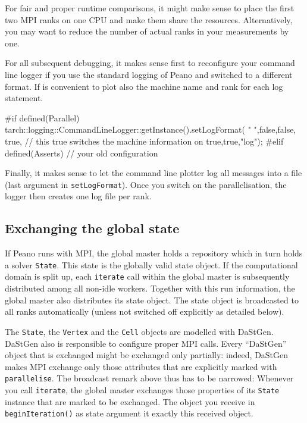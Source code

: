 \begin{remark}
For fair and proper runtime comparisons, it might make sense to place the first
two MPI ranks on one CPU and make them share the resources.
Alternatively, you may want to reduce the number of actual ranks in your
measurements by one.
\end{remark}

For all subsequent debugging, it makes sense first to reconfigure your command
line logger if you use the standard logging of Peano and switched to a different
format. 
If is convenient to plot also the machine name and rank for each log statement.

\begin{code}
#if defined(Parallel)
tarch::logging::CommandLineLogger::getInstance().setLogFormat(
  " ",false,false,
  true, // this true switches the machine information on
  true,true,"log");
#elif defined(Asserts)
// your old configuration
\end{code}

\noindent
Finally, it makes sense to let the command line plotter log all messages into a
file (last argument in \texttt{setLogFormat}).
Once you switch on the parallelisation, the logger then creates one log file per
rank.



\subsection{Exchanging the global state}

If Peano runs with MPI, the global master holds a repository which in turn holds
a solver \texttt{State}. 
This state is the globally valid state object. 
If the computational domain is split up, each \texttt{iterate} call within the
global master is subsequently distributed among all non-idle workers.
Together with this run information, the global master also distributes its state
object.
The state object is broadcasted to all ranks automatically (unless not switched
off explicitly as detailed below).

The \texttt{State}, the \texttt{Vertex} and the \texttt{Cell} objects are
modelled with DaStGen.
DaStGen also is responsible to configure proper MPI calls.
Every ``DaStGen'' object that is exchanged might be exchanged only partially:
indeed, DaStGen makes MPI exchange only those attributes that are explicitly
marked with \texttt{parallelise}.
The broadcast remark above thus has to be narrowed: 
Whenever you call \texttt{iterate}, the global master exchanges those properties
of its \texttt{State} instance that are marked to be exchanged. 
The object you receive in \texttt{beginIteration()} as state argument it exactly
this received object.

